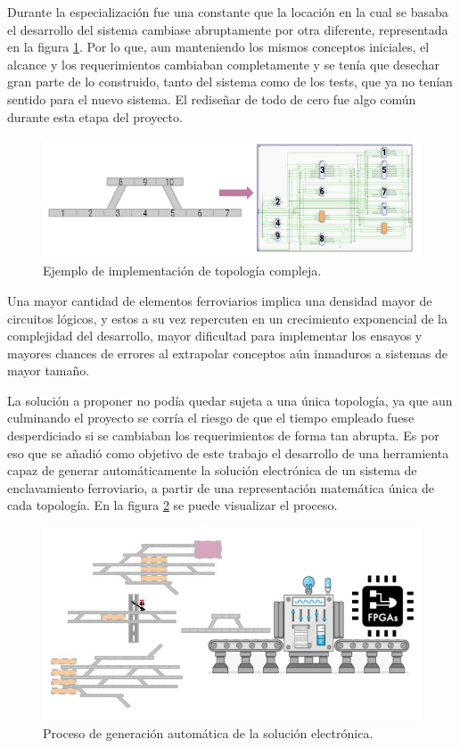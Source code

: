		\vspace{5cm}
		
		Durante la especialización fue una constante que la locación en la cual se basaba el desarrollo del sistema cambiase abruptamente por otra diferente, representada en la figura \ref{fig:CESE_2}. Por lo que, aun manteniendo los mismos conceptos iniciales, el alcance y los requerimientos cambiaban completamente y se tenía que desechar gran parte de lo construido, tanto del sistema como de los tests, que ya no tenían sentido para el nuevo sistema. El rediseñar de todo de cero fue algo común durante esta etapa del proyecto.
		
		\begin{figure}[htbp!]
			\centering
			\includegraphics[scale=.5]{./Figures/Grafo_VHDL_B}
			\caption{Ejemplo de implementación de topología compleja.}
			\label{fig:CESE_2}
		\end{figure}
			
		Una mayor cantidad de elementos ferroviarios implica una densidad mayor de circuitos lógicos, y estos a su vez repercuten en un crecimiento exponencial de la complejidad del desarrollo, mayor dificultad para implementar los ensayos y mayores chances de errores al extrapolar conceptos aún inmaduros a sistemas de mayor tamaño.
		
		La solución a proponer no podía quedar sujeta a una única topología, ya que aun culminando el proyecto se corría el riesgo de que el tiempo empleado fuese desperdiciado si se cambiaban los requerimientos de forma tan abrupta. Es por eso que se añadió como objetivo de este trabajo el desarrollo de una herramienta capaz de generar automáticamente la solución electrónica de un sistema de enclavamiento ferroviario, a partir de una representación matemática única de cada topología. En la figura \ref{fig:Generacion} se puede visualizar el proceso.
		
		\begin{figure}[htbp!]
			\centering
			\includegraphics[scale=.5]{./Figures/Generacion}
			\caption{Proceso de generación automática de la solución electrónica.}
			\label{fig:Generacion}
		\end{figure}
		
